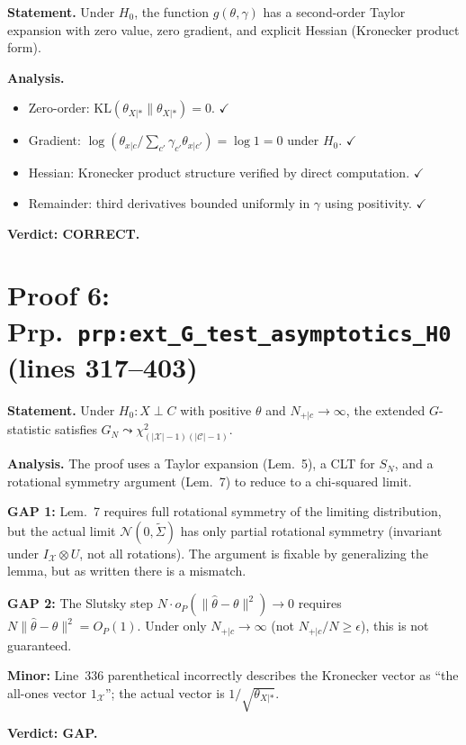\documentclass{article}
\begin{document}
\textbf{Statement.} Under $H_0$, the function $g(\theta,\gamma)$ has a
second-order Taylor expansion with zero value, zero gradient, and explicit
Hessian (Kronecker product form).

\textbf{Analysis.}
\begin{itemize}
  \item Zero-order: $\mathrm{KL}(\theta_{X|\ast}\|\theta_{X|\ast})=0$.  $\checkmark$
  \item Gradient: $\log(\theta_{x|c}/\sum_{c'}\gamma_{c'}\theta_{x|c'})=\log 1=0$
    under $H_0$.  $\checkmark$
  \item Hessian: Kronecker product structure verified by direct computation.
    $\checkmark$
  \item Remainder: third derivatives bounded uniformly in $\gamma$ using
    positivity.  $\checkmark$
\end{itemize}

\textbf{Verdict: CORRECT.}

\section{Proof 6: Prp.\ \texttt{prp:ext\_G\_test\_asymptotics\_H0}
(lines 317--403)}

\textbf{Statement.} Under $H_0:X\perp C$ with positive $\theta$ and
$N_{+|c}\to\infty$, the extended $G$-statistic satisfies
$G_N\leadsto\chi^2_{(|\mathcal{X}|-1)(|\mathcal{C}|-1)}$.

\textbf{Analysis.}
The proof uses a Taylor expansion (Lem.~5), a CLT for $S_N$, and a rotational
symmetry argument (Lem.~7) to reduce to a chi-squared limit.

\textbf{GAP 1:} Lem.~7 requires full rotational symmetry of the limiting
distribution, but the actual limit $\mathcal{N}(0,\tilde\Sigma)$ has only
partial rotational symmetry (invariant under $I_\mathcal{X}\otimes U$,
not all rotations).  The argument is fixable by generalizing the lemma,
but as written there is a mismatch.

\textbf{GAP 2:} The Slutsky step $N\cdot o_P(\|\hat\theta-\theta\|^2)\to 0$
requires $N\|\hat\theta-\theta\|^2=O_P(1)$.  Under only $N_{+|c}\to\infty$
(not $N_{+|c}/N\ge\epsilon$), this is not guaranteed.

\textbf{Minor:} Line~336 parenthetical incorrectly describes the Kronecker
vector as ``the all-ones vector $1_\mathcal{X}$''; the actual vector is
$1/\sqrt{\theta_{X|\ast}}$.

\textbf{Verdict: GAP.}
\end{document}
